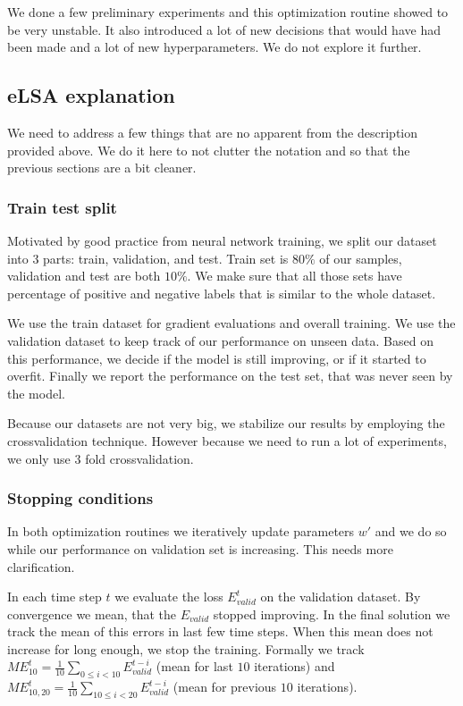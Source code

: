     We done a few preliminary experiments and this optimization routine showed to be very unstable.
    It also introduced a lot of new decisions that would have had been made and a lot of new hyperparameters.
    We do not explore it further.
    
    
    \subsection{eLSA explanation}
    We need to address a few things that are no apparent from the description provided above.
    We do it here to not clutter the notation and so that the previous sections are a bit cleaner. 
    
    \subsubsection{Train test split} \label{sec:train:test:split}
    
    Motivated by good practice from neural network training,
    we split our dataset into $3$ parts: train, validation, and test.
    Train set is $80\%$ of our samples, validation and test are both $10\%$.
    We make sure that all those sets have percentage of positive and negative labels that is similar to the whole dataset.
    
    We use the train dataset for gradient evaluations and overall training. 
    We use the validation dataset to keep track of our performance on unseen data.
    Based on this performance, we decide if the model is still improving, or if it started to overfit.
    Finally we report the performance on the test set, that was never seen by the model.
    
    Because our datasets are not very big, we stabilize our results by employing the crossvalidation technique.  
    However because we need to run a lot of experiments, we only use $3$ fold crossvalidation.
    
    \subsubsection{Stopping conditions} \label{sec:elsa:stopping}
    
    In both optimization routines we iteratively update parameters $w'$ and we do so while our performance on validation set is increasing.
    This needs more clarification.
    
    In each time step $t$ we evaluate the loss $E_{valid}^t$ on the validation dataset.
    By convergence we mean, that the $E_{valid}$ stopped improving.
    In the final solution we track the mean of this errors in last few time steps.
    When this mean does not increase for long enough, we stop the training. 
    Formally we track 
    $ME_{10}^t = \frac{1}{10} \sum_{0\leq i < 10} E_{valid}^{t-i}$ (mean for last $10$ iterations) and
    $ME_{10,20}^t = \frac{1}{10} \sum_{10\leq i < 20} E_{valid}^{t-i}$ (mean for previous $10$ iterations).
    
